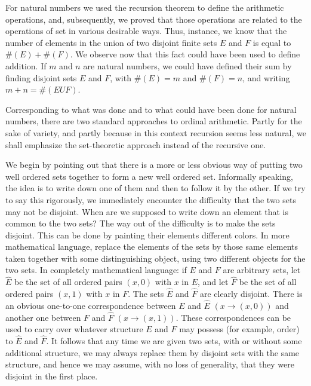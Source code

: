 
For natural numbers we used the recursion theorem to define the arithmetic operations, and, subsequently, we proved that those operations are related to the operations of set in various desirable ways. Thus, instance, we know that the number of elements in the union of two disjoint finite sets $E$ and $F$ is equal to $\# (E) + \# (F)$. We observe now that this fact could have been used to define addition. If $m$ and $n$ are natural numbers, we could have defined their sum by finding disjoint sets $E$ and $F$, with $\# (E) = m$ and $\# (F) = n$, and writing $m+ n = \# (E U F)$.

Corresponding to what was done and to what could have been done for natural numbers, there are two standard approaches to ordinal arithmetic. Partly for the sake of variety, and partly because in this context recursion seems less natural, we shall emphasize the set-theoretic approach instead of the recursive one. 

We begin by pointing out that there is a more or less obvious way of putting two well ordered sets together to form a new well  ordered set. Informally speaking, the idea is to write down one of them and then to follow it by the other. If we try to say this rigorously, we immediately encounter the difficulty that the two sets may not be disjoint. When are we supposed to write down an element that is common to the two sets? The way out of the difficulty is to make the sets disjoint. This can be done by painting their elements different colors. In more mathematical language, replace the elements of the sets by those same elements taken together with some distinguishing object, using two different objects for the two sets. In completely mathematical language: if $E$ and $F$ are arbitrary sets, let $\hat{E}$ be the set of all ordered pairs $(x, 0)$ with $x$ in $E$, and let $\hat{F}$ be the set of all ordered pairs $(x,1)$ with $x$ in $F$. The sets $\hat{E}$ and $\hat{F}$ are clearly disjoint. There is an obvious one-to-one correspondence between $E$ and $\hat{E}$ $(x \rightarrow (x,0))$ and another one between $F$ and $\hat{F}$ $(x \rightarrow (x,1))$. These correspondences can be used to carry over whatever structure $E$ and $F$ may possess (for example, order) to $\hat{E}$ and $\hat{F}$. It follows that any time we are given two sets, with or without some additional structure, we may always replace them by disjoint sets with the same structure, and hence we may assume, with no loss of generality, that they were disjoint in the first place. 

